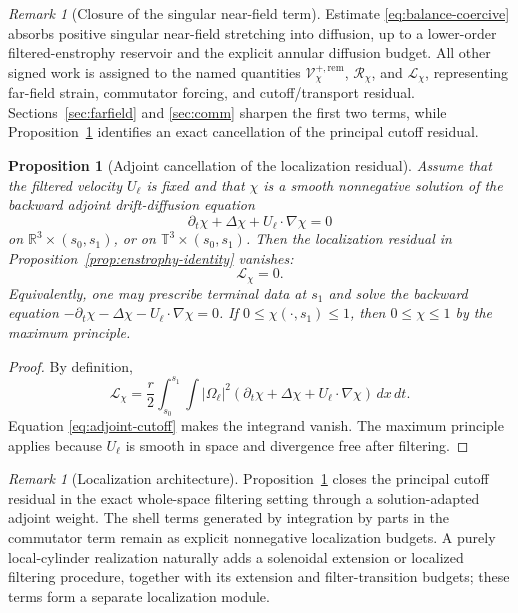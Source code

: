 \documentclass[11pt]{article}
\numberwithin{equation}{section}
\theoremstyle{plain}
\newtheorem{proposition}[theorem]{Proposition}
\theoremstyle{definition}
\theoremstyle{remark}
\newtheorem{remark}[theorem]{Remark}
\begin{document}
\begin{remark}[Closure of the singular near-field term]
Estimate \eqref{eq:balance-coercive} absorbs positive singular near-field stretching into diffusion, up to a lower-order filtered-enstrophy reservoir and the explicit annular diffusion budget.  All other signed work is assigned to the named quantities $\mathcal V_\chi^{+,\mathrm{rem}}$, $\mathcal R_\chi$, and $\mathcal L_\chi$, representing far-field strain, commutator forcing, and cutoff/transport residual.  Sections~\ref{sec:farfield} and \ref{sec:comm} sharpen the first two terms, while Proposition~\ref{prop:adjoint-residual} identifies an exact cancellation of the principal cutoff residual.
\end{remark}

\begin{proposition}[Adjoint cancellation of the localization residual]\label{prop:adjoint-residual}
Assume that the filtered velocity $U_\ell$ is fixed and that $\chi$ is a smooth nonnegative solution of the backward adjoint drift-diffusion equation
\begin{equation}\label{eq:adjoint-cutoff}
\partial_t\chi+\Delta\chi+U_\ell\cdot\nabla\chi=0
\end{equation}
on $\mathbb R^3\times(s_0,s_1)$, or on $\mathbb T^3\times(s_0,s_1)$.  Then the localization residual in Proposition~\ref{prop:enstrophy-identity} vanishes:
\begin{equation}\label{eq:adjoint-residual-zero}
\mathcal L_\chi=0.
\end{equation}
Equivalently, one may prescribe terminal data at $s_1$ and solve the backward equation $-\partial_t\chi-\Delta\chi-U_\ell\cdot\nabla\chi=0$.  If $0\le \chi(\cdot,s_1)\le1$, then $0\le\chi\le1$ by the maximum principle.
\end{proposition}

\begin{proof}
By definition,
\[
\mathcal L_\chi=\frac r2\int_{s_0}^{s_1}\!\int |\Omega_\ell|^2
(\partial_t\chi+\Delta\chi+U_\ell\cdot\nabla\chi)\,dx\,dt.
\]
Equation \eqref{eq:adjoint-cutoff} makes the integrand vanish.  The maximum principle applies because $U_\ell$ is smooth in space and divergence free after filtering.
\end{proof}

\begin{remark}[Localization architecture]\label{rem:localization-residual-scope}
Proposition~\ref{prop:adjoint-residual} closes the principal cutoff residual in the exact whole-space filtering setting through a solution-adapted adjoint weight.  The shell terms generated by integration by parts in the commutator term remain as explicit nonnegative localization budgets.  A purely local-cylinder realization naturally adds a solenoidal extension or localized filtering procedure, together with its extension and filter-transition budgets; these terms form a separate localization module.
\end{remark}
\end{document}
